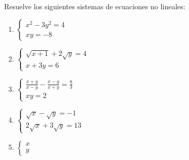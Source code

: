 \Exercicio Resuelve los siguientes sistemas de ecuaciones no lineales:

\begin{enumerate}[topsep=0pt]
	\item $ \begin{cases}
		x^2 - 3y^2 = 4 \\
		xy = -8
	\end{cases}  $
	\item $ \begin{cases}
		\sqrt{x+1} + 2\sqrt{y} = 4 \\
		x+3y=6
	\end{cases}  $
	\item $ \begin{cases}
		\frac{x+y}{x-y} -\frac{x-y}{x+y} = \frac{8}{3} \\
		xy = 2
	\end{cases}  $
	\item $ \begin{cases}
		\sqrt{x} - \sqrt{y} = -1 \\
		2\sqrt{x} + 3\sqrt{y} = 13
	\end{cases}  $

	\item $ \begin{cases}
		x \\
		y
	\end{cases}  $
\end{enumerate}


